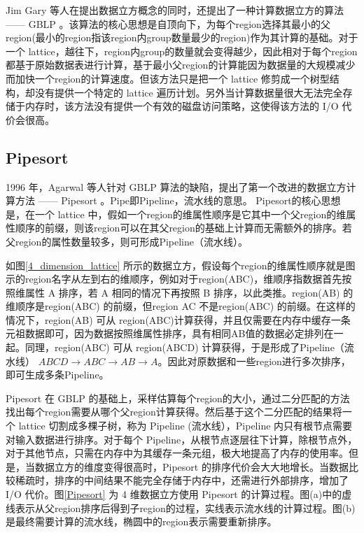 Jim Gary 等人在提出数据立方概念的同时，还提出了一种计算数据立方的算法 —— GBLP \cite{gray1997data}。该算法的核心思想是自顶向下，为每个region选择其最小的父region(最小的region指该region内group数量最少的region)作为其计算的基础。对于一个 lattice，越往下，region内group的数量就会变得越少，因此相对于每个region都基于原始数据表进行计算，基于最小父region的计算能因为数据量的大规模减少而加快一个region的计算速度。但该方法只是把一个 lattice 修剪成一个树型结构，却没有提供一个特定的 lattice 遍历计划。另外当计算数据量很大无法完全存储于内存时，该方法没有提供一个有效的磁盘访问策略，这使得该方法的 I/O 代价会很高。

\subsection{Pipesort}

1996 年，Agarwal 等人针对 GBLP 算法的缺陷，提出了第一个改进的数据立方计算方法 —— Pipesort\cite{agarwal1996computation} 。Pipe即Pipeline，流水线的意思。
Pipesort的核心思想是，在一个 lattice 中，假如一个region的维属性顺序是它其中一个父region的维属性顺序的前缀，则该region可以在其父region的基础上计算而无需额外的排序。若父region的属性数量较多，则可形成Pipeline（流水线）。

如图\ref{4_dimension_lattice} 所示的数据立方，假设每个region的维属性顺序就是图示的region名字从左到右的维顺序，例如对于region(ABC)，维顺序指数据首先按照维属性 A 排序，若 A 相同的情况下再按照 B 排序，以此类推。region(AB) 的维顺序是region(ABC) 的前缀，但region AC 不是region(ABC) 的前缀。在这样的情况下，region(AB) 可从 region(ABC)计算获得，并且仅需要在内存中缓存一条元祖数据即可，因为数据按照维属性排序，具有相同AB值的数据必定排列在一起。同理，region(ABC) 可从 region(ABCD) 计算获得，于是形成了Pipeline（流水线） $ABCD\rightarrow ABC\rightarrow AB\rightarrow A$。因此对原数据和一些region进行多次排序，即可生成多条Pipeline。

Pipesort 在 GBLP 的基础上，采样估算每个region的大小，通过二分匹配的方法找出每个region需要从哪个父region计算获得。然后基于这个二分匹配的结果将一个 lattice 切割成多棵子树，称为 Pipeline (流水线），Pipeline 内只有根节点需要对输入数据进行排序。对于每个 Pipeline，从根节点逐层往下计算，除根节点外，对于其他节点，只需在内存中为其缓存一条元组，极大地提高了内存的使用率。但是，当数据立方的维度变得很高时，Pipesort 的排序代价会大大地增长。当数据比较稀疏时，排序的中间结果不能完全存储于内存中，还需进行外部排序，增加了 I/O 代价。图\ref{Pipesort} 为 4 维数据立方使用 Pipesort 的计算过程。图(a)中的虚线表示从父region排序后得到子region的过程，实线表示流水线的计算过程。图(b)是最终需要计算的流水线，椭圆中的region表示需要重新排序。


